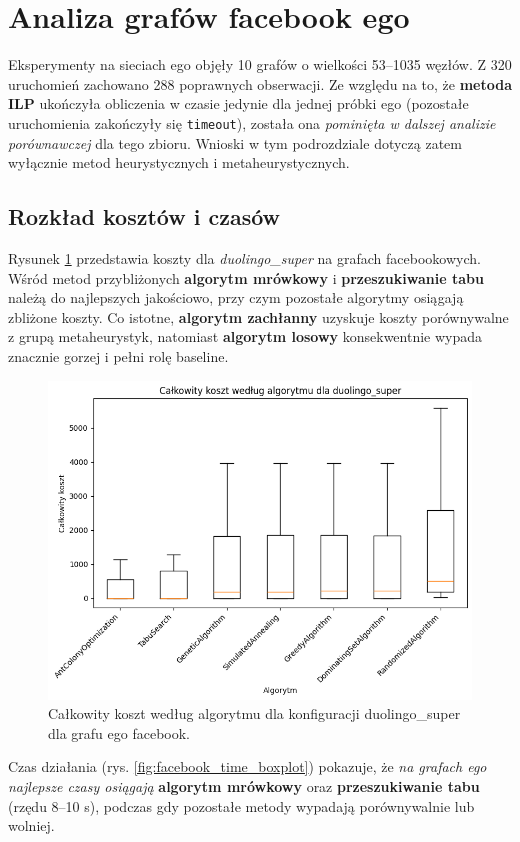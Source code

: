 \section{Analiza grafów facebook ego}

Eksperymenty na sieciach ego objęły 10 grafów o wielkości 53--1035 węzłów. Z 320 uruchomień zachowano 288 poprawnych obserwacji. Ze względu na to, że \textbf{metoda ILP} ukończyła obliczenia w czasie jedynie dla jednej próbki ego (pozostałe uruchomienia zakończyły się \texttt{timeout}), została ona \emph{pominięta w dalszej analizie porównawczej} dla tego zbioru. Wnioski w tym podrozdziale dotyczą zatem wyłącznie metod heurystycznych i metaheurystycznych.

\subsection{Rozkład kosztów i czasów}

Rysunek \ref{fig:facebook_cost_boxplot} przedstawia koszty dla \emph{duolingo\_super} na grafach facebookowych. Wśród metod przybliżonych \textbf{algorytm mrówkowy} i \textbf{przeszukiwanie tabu} należą do najlepszych jakościowo, przy czym pozostałe algorytmy osiągają zbliżone koszty. Co istotne, \textbf{algorytm zachłanny} uzyskuje koszty porównywalne z grupą metaheurystyk, natomiast \textbf{algorytm losowy} konsekwentnie wypada znacznie gorzej i pełni rolę baseline.

\begin{figure}[H]
  \centering
  \includegraphics[width=0.7\linewidth]{assets/figures/facebook_cost_boxplot.png}
  \caption{Całkowity koszt według algorytmu dla konfiguracji duolingo\_super dla grafu ego facebook.}
  \label{fig:facebook_cost_boxplot}
\end{figure}

Czas działania (rys. \ref{fig:facebook_time_boxplot}) pokazuje, że \emph{na grafach ego najlepsze czasy osiągają} \textbf{algorytm mrówkowy} oraz \textbf{przeszukiwanie tabu} (rzędu 8--10 s), podczas gdy pozostałe metody wypadają porównywalnie lub wolniej.

